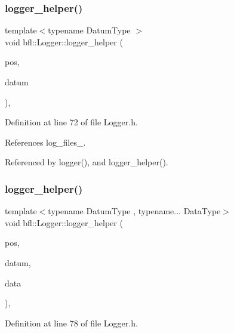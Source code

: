 \subsubsection{\texorpdfstring{logger\+\_\+helper()}{logger\_helper()}\hspace{0.1cm}{\footnotesize\ttfamily [1/4]}}
{\footnotesize\ttfamily template$<$typename Datum\+Type $>$ \\
void bfl\+::\+Logger\+::logger\+\_\+helper (\begin{DoxyParamCaption}\item[{const size\+\_\+t}]{pos,  }\item[{Datum\+Type}]{datum }\end{DoxyParamCaption})\hspace{0.3cm}{\ttfamily [inline]}, {\ttfamily [private]}}



Definition at line 72 of file Logger.\+h.



References log\+\_\+files\+\_\+.



Referenced by logger(), and logger\+\_\+helper().

\mbox{\label{classbfl_1_1Logger_ac45b73649e685802837bf97c10146c3a}} 
\subsubsection{\texorpdfstring{logger\+\_\+helper()}{logger\_helper()}\hspace{0.1cm}{\footnotesize\ttfamily [2/4]}}
{\footnotesize\ttfamily template$<$typename Datum\+Type , typename... Data\+Type$>$ \\
void bfl\+::\+Logger\+::logger\+\_\+helper (\begin{DoxyParamCaption}\item[{const size\+\_\+t}]{pos,  }\item[{Datum\+Type}]{datum,  }\item[{Data\+Type...}]{data }\end{DoxyParamCaption})\hspace{0.3cm}{\ttfamily [inline]}, {\ttfamily [private]}}



Definition at line 78 of file Logger.\+h.



